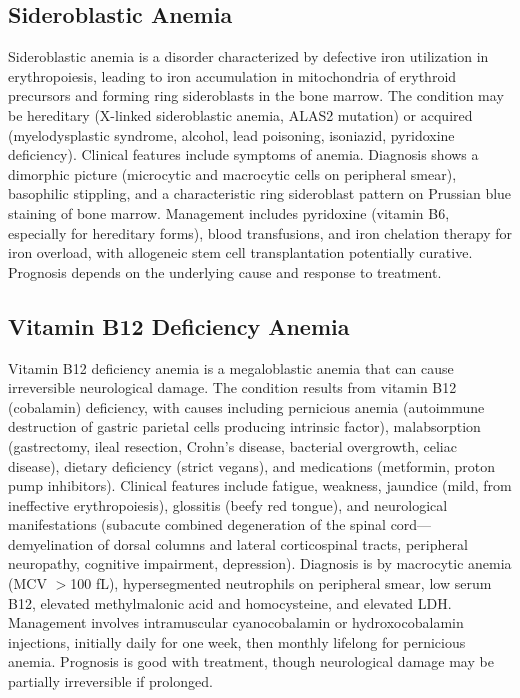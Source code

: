 \subsection{Sideroblastic Anemia}
\label{sec:Sideroblastic Anemia}
Sideroblastic anemia is a disorder characterized by defective iron utilization in erythropoiesis, leading to iron accumulation in mitochondria of erythroid precursors and forming ring sideroblasts in the bone marrow. The condition may be hereditary (X-linked sideroblastic anemia, ALAS2 mutation) or acquired (myelodysplastic syndrome, alcohol, lead poisoning, isoniazid, pyridoxine deficiency). Clinical features include symptoms of anemia. Diagnosis shows a dimorphic picture (microcytic and macrocytic cells on peripheral smear), basophilic stippling, and a characteristic ring sideroblast pattern on Prussian blue staining of bone marrow. Management includes pyridoxine (vitamin B6, especially for hereditary forms), blood transfusions, and iron chelation therapy for iron overload, with allogeneic stem cell transplantation potentially curative. Prognosis depends on the underlying cause and response to treatment.

\subsection{Vitamin B12 Deficiency Anemia}
\label{sec:Vitamin B12 Deficiency Anemia}
Vitamin B12 deficiency anemia is a megaloblastic anemia that can cause irreversible neurological damage. The condition results from vitamin B12 (cobalamin) deficiency, with causes including pernicious anemia (autoimmune destruction of gastric parietal cells producing intrinsic factor), malabsorption (gastrectomy, ileal resection, Crohn's disease, bacterial overgrowth, celiac disease), dietary deficiency (strict vegans), and medications (metformin, proton pump inhibitors). Clinical features include fatigue, weakness, jaundice (mild, from ineffective erythropoiesis), glossitis (beefy red tongue), and neurological manifestations (subacute combined degeneration of the spinal cord---demyelination of dorsal columns and lateral corticospinal tracts, peripheral neuropathy, cognitive impairment, depression). Diagnosis is by macrocytic anemia (MCV $>$100 fL), hypersegmented neutrophils on peripheral smear, low serum B12, elevated methylmalonic acid and homocysteine, and elevated LDH. Management involves intramuscular cyanocobalamin or hydroxocobalamin injections, initially daily for one week, then monthly lifelong for pernicious anemia. Prognosis is good with treatment, though neurological damage may be partially irreversible if prolonged.

